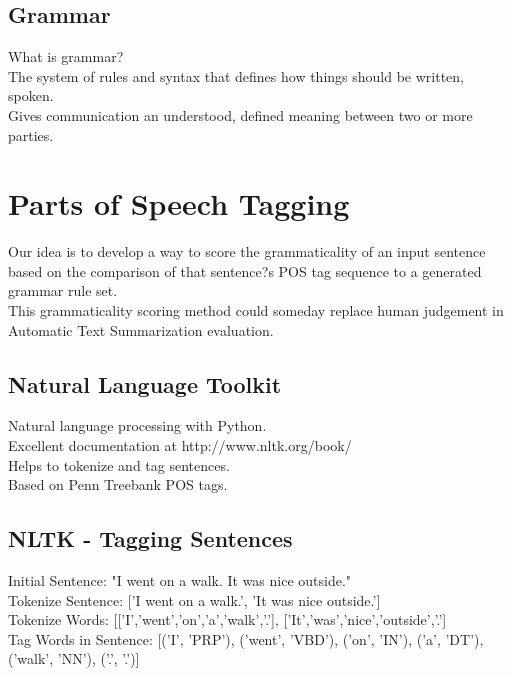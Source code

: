 \documentclass[12pt,a4paper]{article}
\begin{document}
\subsection{Grammar}
What is grammar?\\
The system of rules and syntax that defines how things should be written, spoken.\\
Gives communication an understood, defined meaning between two or more parties.


\section{Parts of Speech Tagging}
Our idea is to develop a way to score the grammaticality of an input sentence based on the comparison of that sentence?s POS tag sequence to a generated grammar rule set.\\
This grammaticality scoring method could someday replace human judgement in Automatic Text Summarization evaluation.


\subsection{Natural Language Toolkit}

Natural language processing with Python.\\
Excellent documentation at http://www.nltk.org/book/ \\
Helps to tokenize and tag sentences.\\
Based on Penn Treebank POS tags.\\

\subsection{NLTK - Tagging Sentences}

Initial Sentence: "I went on a walk. It was nice outside."\\
Tokenize Sentence: ['I went on a walk.', 'It was nice outside.']\\
Tokenize Words: [['I','went','on','a','walk','.'], ['It','was','nice','outside','.']\\
Tag Words in Sentence: [('I', 'PRP'), ('went', 'VBD'), ('on', 'IN'), ('a', 'DT'), ('walk', 'NN'), ('.', '.')]\\
\end{document}
